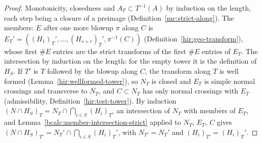 \begin{proof}
\mixedleanok
Monotonicity, closedness and \(A_T\subset T^{-1}(A)\) by induction on the length, each step being a closure of a preimage (Definition~\ref{mc:strict-along}).
The members: \(E\) after one more blowup \(\pi\) along \(C\) is \(E_T'=((H_1)_T',\dots,(H_{s+r})_T',\pi^{-1}(C))\) (Definition~\ref{hir:geo-transform}), whose first
\(\#E\) entries are the strict transforms of the first \(\#E\) entries of \(E_T\). The intersection by induction on the length: for the empty tower it is the
definition of \(H_S\). If \(T'\) is \(T\) followed by the blowup along \(C\), the transform along \(T\) is well formed (Lemma~\ref{hir:wellformed-tower}), so \(N_T\)
is closed and \(E_T\) is simple normal crossings and transverse to \(N_T\), and \(C\subset N_T\) has only normal crossings with \(E_T\) (admissibility,
Definition~\ref{hir:test-tower}). By induction \((N\cap H_S)_T=N_T\cap\bigcap_{i\in S}(H_i)_T\), an intersection of \(N_T\) with members of \(E_T\), and
Lemma~\ref{bcalc:member-intersection-strict} applied to \(N_T\), \(E_T\), \(C\) gives \((N\cap H_S)_{T'}=N_T'\cap\bigcap_{i\in S}(H_i)_T'\), with
\(N_{T'}=N_T'\) and \((H_i)_{T'}=(H_i)_T'\).
\end{proof}
